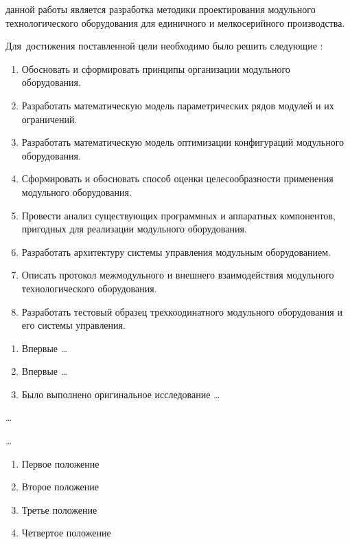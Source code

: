 
{\aim} данной работы является разработка методики проектирования модульного технологического оборудования для единичного и мелкосерийного производства.

Для~достижения поставленной цели необходимо было решить следующие {\tasks}:
\begin{enumerate}[beginpenalty=10000] %
  \item Обосновать и сформировать принципы организации модульного оборудования.
  \item Разработать математическую модель параметрических рядов модулей и их ограничений.
  \item Разработать математическую модель оптимизации конфигураций модульного оборудования.
  \item Сформировать и обосновать способ оценки целесообразности применения модульного оборудования.
  \item Провести анализ существующих программных и аппаратных компонентов, пригодных для реализации модульного оборудования.
  \item Разработать архитектуру системы управления модульным оборудованием.
  \item Описать протокол межмодульного и внешнего взаимодействия модульного технологического оборудования.
  \item Разработать тестовый образец трехкоодинатного модульного оборудования и его системы управления.
\end{enumerate}


{\novelty}
\begin{enumerate}[beginpenalty=10000] %
  \item Впервые \ldots
  \item Впервые \ldots
  \item Было выполнено оригинальное исследование \ldots
\end{enumerate}

{\influence} \ldots

{\methods} \ldots

{}
\begin{enumerate}[beginpenalty=10000] %
  \item Первое положение
  \item Второе положение
  \item Третье положение
  \item Четвертое положение
\end{enumerate}

